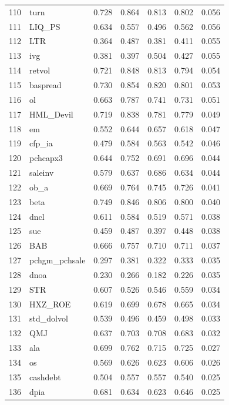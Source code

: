 \documentclass[12pt]{article}
\begin{document}
\begin{footnotesize}
\begin{longtable}{rl|c|c|c|c|c}
		110 & turn & 0.728 & 0.864 & 0.813 & 0.802 & 0.056 \\ 
		111 & LIQ\_PS & 0.634 & 0.557 & 0.496 & 0.562 & 0.056 \\ 
		112 & LTR & 0.364 & 0.487 & 0.381 & 0.411 & 0.055 \\ 
		113 & ivg & 0.381 & 0.397 & 0.504 & 0.427 & 0.055 \\ 
		114 & retvol & 0.721 & 0.848 & 0.813 & 0.794 & 0.054 \\ 
		115 & baspread & 0.730 & 0.854 & 0.820 & 0.801 & 0.053 \\ 
		116 & ol & 0.663 & 0.787 & 0.741 & 0.731 & 0.051 \\ 
		117 & HML\_Devil & 0.719 & 0.838 & 0.781 & 0.779 & 0.049 \\ 
		118 & em & 0.552 & 0.644 & 0.657 & 0.618 & 0.047 \\ 
		119 & cfp\_ia & 0.479 & 0.584 & 0.563 & 0.542 & 0.046 \\ 
		120 & pchcapx3 & 0.644 & 0.752 & 0.691 & 0.696 & 0.044 \\ 
		121 & saleinv & 0.579 & 0.637 & 0.686 & 0.634 & 0.044 \\ 
		122 & ob\_a & 0.669 & 0.764 & 0.745 & 0.726 & 0.041 \\ 
		123 & beta & 0.749 & 0.846 & 0.806 & 0.800 & 0.040 \\ 
		124 & dncl & 0.611 & 0.584 & 0.519 & 0.571 & 0.038 \\ 
		125 & sue & 0.459 & 0.487 & 0.397 & 0.448 & 0.038 \\ 
		126 & BAB & 0.666 & 0.757 & 0.710 & 0.711 & 0.037 \\ 
		127 & pchgm\_pchsale & 0.297 & 0.381 & 0.322 & 0.333 & 0.035 \\ 
		128 & dnoa & 0.230 & 0.266 & 0.182 & 0.226 & 0.035 \\ 
		129 & STR & 0.607 & 0.526 & 0.546 & 0.559 & 0.034 \\ 
		130 & HXZ\_ROE & 0.619 & 0.699 & 0.678 & 0.665 & 0.034 \\ 
		131 & std\_dolvol & 0.539 & 0.496 & 0.459 & 0.498 & 0.033 \\ 
		132 & QMJ & 0.637 & 0.703 & 0.708 & 0.683 & 0.032 \\ 
		133 & ala & 0.699 & 0.762 & 0.715 & 0.725 & 0.027 \\ 
		134 & os & 0.569 & 0.626 & 0.623 & 0.606 & 0.026 \\ 
		135 & cashdebt & 0.504 & 0.557 & 0.557 & 0.540 & 0.025 \\ 
		136 & dpia & 0.681 & 0.634 & 0.623 & 0.646 & 0.025 \\ 

\end{longtable}
\end{footnotesize}
\end{document}
